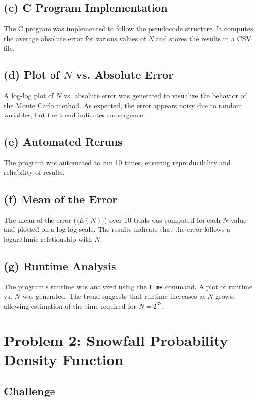 \documentclass{article}
\begin{document}
\subsection{(c) C Program Implementation}

The C program was implemented to follow the pseudocode structure. It computes the average absolute error for various values of $N$ and stores the results in a CSV file.

\subsection{(d) Plot of $N$ vs. Absolute Error}

A log-log plot of $N$ vs. absolute error was generated to visualize the behavior of the Monte Carlo method. As expected, the error appears noisy due to random variables, but the trend indicates convergence.

\subsection{(e) Automated Reruns}

The program was automated to run 10 times, ensuring reproducibility and reliability of results.

\subsection{(f) Mean of the Error}

The mean of the error ($ \langle E(N) \rangle $) over 10 trials was computed for each $N$ value and plotted on a log-log scale. The results indicate that the error follows a logarithmic relationship with $N$.

\subsection{(g) Runtime Analysis}

The program's runtime was analyzed using the \texttt{time} command. A plot of runtime vs. $N$ was generated. The trend suggests that runtime increases as $N$ grows, allowing estimation of the time required for $N = 2^{32}$.

\section{Problem 2: Snowfall Probability Density Function}

\subsection{Challenge}
\end{document}
